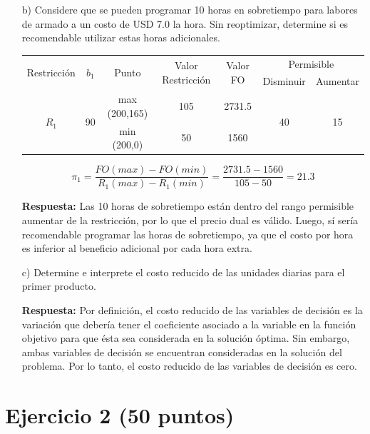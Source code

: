 \documentclass[letterpaper,11pt,oneside]{article}
\begin{document}
\begin{itemize}
	\item[b)] Considere que se pueden programar 10 horas en sobretiempo para labores de armado a un costo de USD 7.0 la hora. Sin reoptimizar, determine si es recomendable utilizar estas horas adicionales.
	
	\begin{table}[hbt]
		\centering
		\begin{tabular}{c c c c c | c c}
			\hline\hline
			\multirow{2}{*}{Restricción} & \multirow{2}{*}{$b_{1}$} & \multirow{2}{*}{Punto} & \multirow{2}{*}{Valor Restricción} & \multirow{2}{*}{Valor FO} & \multicolumn{2}{c}{Permisible}\\
			\cline{6-7}
			& & & & & Disminuir & Aumentar\\
			\hline
			\multirow{2}{*}{$R_{1}$} & \multirow{2}{*}{90} & max (200,165) & 105 & 2731.5 & \multirow{2}{*}{40} & \multirow{2}{*}{15}\\
			& & min (200,0) & 50 & 1560 & & \\
			\hline\hline
		\end{tabular}
	\end{table}
	
	\begin{equation*}
	\pi_{1}=\frac{FO(max)-FO(min)}{R_{1}(max)-R_{1}(min)}=\frac{2731.5-1560}{105-50}=21.3
	\end{equation*}
	
	\textbf{Respuesta:} Las 10 horas de sobretiempo están dentro del rango permisible aumentar de la restricción, por lo que el precio dual es válido. Luego, sí sería recomendable programar las horas de sobretiempo, ya que el costo por hora es inferior al beneficio adicional por cada hora extra.
	
	\item[c)] Determine e interprete el costo reducido de las unidades diarias para el primer producto.
	
	\textbf{Respuesta:} Por definición, el costo reducido de las variables de decisión es la variación que debería tener el coeficiente asociado a la variable en la función objetivo para que ésta sea considerada en la solución óptima. Sin embargo, ambas variables de decisión se encuentran consideradas en la solución del problema. Por lo tanto, el costo reducido de las variables de decisión es cero.
\end{itemize}

\section*{Ejercicio 2 (50 puntos)}
\end{document}
